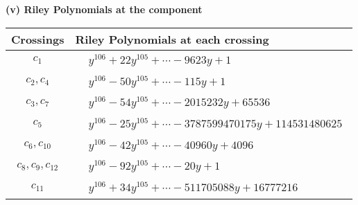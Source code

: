 \documentclass[1p]{elsarticle_modified}
\theoremstyle{definition}
\begin{document}
\newpage\renewcommand{\arraystretch}{1}
\flushleft \textbf{(v) Riley Polynomials at the component}\newline \\
\begin{tabular}{m{50pt}|m{274pt}}
Crossings & \hspace{64pt}Riley Polynomials at each crossing \\
\hline $$\begin{aligned}c_{1}\end{aligned}$$&$\begin{aligned}
&y^{106}+22 y^{105}+\cdots-9623 y+1
\end{aligned}$\\
\hline $$\begin{aligned}c_{2},c_{4}\end{aligned}$$&$\begin{aligned}
&y^{106}-50 y^{105}+\cdots-115 y+1
\end{aligned}$\\
\hline $$\begin{aligned}c_{3},c_{7}\end{aligned}$$&$\begin{aligned}
&y^{106}-54 y^{105}+\cdots-2015232 y+65536
\end{aligned}$\\
\hline $$\begin{aligned}c_{5}\end{aligned}$$&$\begin{aligned}
&y^{106}-25 y^{105}+\cdots-3787599470175 y+114531480625
\end{aligned}$\\
\hline $$\begin{aligned}c_{6},c_{10}\end{aligned}$$&$\begin{aligned}
&y^{106}-42 y^{105}+\cdots-40960 y+4096
\end{aligned}$\\
\hline $$\begin{aligned}c_{8},c_{9},c_{12}\end{aligned}$$&$\begin{aligned}
&y^{106}-92 y^{105}+\cdots-20 y+1
\end{aligned}$\\
\hline $$\begin{aligned}c_{11}\end{aligned}$$&$\begin{aligned}
&y^{106}+34 y^{105}+\cdots-511705088 y+16777216
\end{aligned}$\\
\hline
\end{tabular}\\~\\
\end{document}
